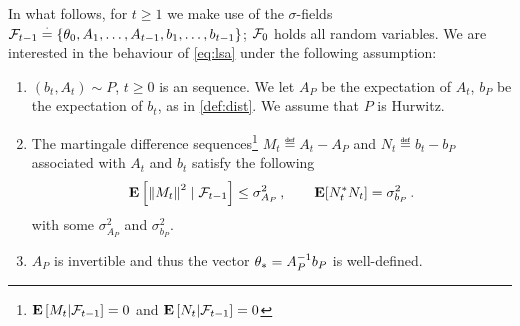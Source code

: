 In what follows, for $t\ge1$ we make use of the $\sigma$-fields $\mathcal{F}_{t-1}\stackrel{\cdot}{=}\{\theta_0,A_1,\ldots, A_{t-1}, b_1,\ldots, b_{t-1}\}$; $\mathcal{F}_0$ holds all random variables. 
We are interested in the behaviour of \eqref{eq:lsa} under the following assumption:
\begin{assumption}\label{assmp:lsa}
\begin{enumerate}[leftmargin=*, before = \leavevmode\vspace{-\baselineskip}]
\item \label{dist} $(b_t, A_t)\sim P$, $t\geq 0$ is an \iid sequence.
We let $A_P$ be the expectation of $A_t$, $b_P$ be the expectation of $b_t$, as in \cref{def:dist}.
We assume that $P$ is Hurwitz.
\item \label{matvar} The martingale difference sequences\footnote{$\mathbf{E}\left[M_t|\mathcal{F}_{t-1}\right]=0$ and $\mathbf{E}\left[N_t|\mathcal{F}_{t-1}\right]=0$} $M_t\eqdef A_t-A_{P}$ and $N_t\eqdef b_t-b_{P}$ associated with $A_t$ and $b_t$ satisfy the following
\begin{align*}
	\mathbf{E}\left[ \left\| M_t\right\|^2\mid\mathcal{F}_{t-1}\right]\leq \sigma^2_{A_P}\,, \qquad 
	\mathbf{E}[N_t^* N_t]=\sigma^2_{b_P}\,.
\end{align*}
with some $\sigma^2_{A_P}$ and $\sigma^2_{b_P}$. 
\item $A_P$ is invertible and thus the vector $\theta_*=A^{-1}_Pb_P$ is well-defined. 
\end{enumerate}
\end{assumption}
